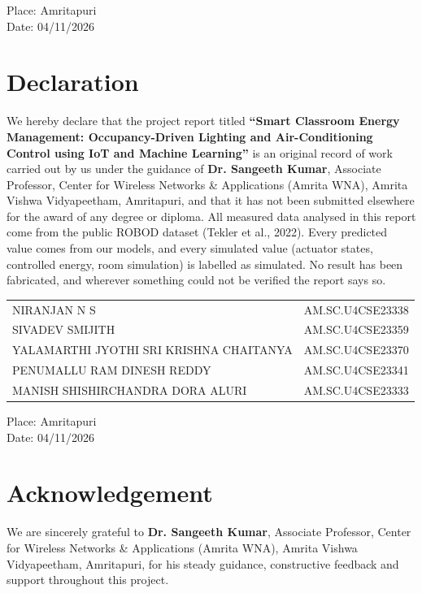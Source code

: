 \documentclass[12pt,a4paper,oneside]{report}
\newcommand{\reporttitle}{Smart Classroom Energy Management: Occupancy-Driven Lighting and Air-Conditioning Control using IoT and Machine Learning}
\begin{document}
\vspace{14mm}
\noindent Place: Amritapuri\\
Date: 04/11/2026

\chapter*{Declaration}
We hereby declare that the project report titled \textbf{``\reporttitle''} is an original record of work carried out
by us under the guidance of \textbf{Dr. Sangeeth Kumar}, Associate Professor, Center for Wireless Networks \&
Applications (Amrita WNA), Amrita Vishwa Vidyapeetham, Amritapuri, and that it has not been submitted elsewhere for
the award of any degree or diploma. All measured data analysed in this report come from the public ROBOD dataset
(Tekler et al., 2022). Every predicted value comes from our models, and every simulated value (actuator states,
controlled energy, room simulation) is labelled as simulated. No result has been fabricated, and wherever something
could not be verified the report says so.

\vspace{14mm}
\noindent
\begin{tabular}{@{}ll}
NIRANJAN N S & AM.SC.U4CSE23338\\
SIVADEV SMIJITH & AM.SC.U4CSE23359\\
YALAMARTHI JYOTHI SRI KRISHNA CHAITANYA & AM.SC.U4CSE23370\\
PENUMALLU RAM DINESH REDDY & AM.SC.U4CSE23341\\
MANISH SHISHIRCHANDRA DORA ALURI & AM.SC.U4CSE23333\\
\end{tabular}

\vspace{10mm}
\noindent Place: Amritapuri\\
Date: 04/11/2026

\chapter*{Acknowledgement}
We are sincerely grateful to \textbf{Dr. Sangeeth Kumar}, Associate Professor, Center for Wireless Networks \&
Applications (Amrita WNA), Amrita Vishwa Vidyapeetham, Amritapuri, for his steady guidance, constructive feedback and
support throughout this project.
\end{document}
